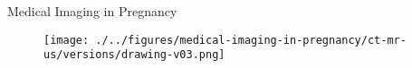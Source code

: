 
{
\begin{frame}{Medical Imaging in Pregnancy}
      \begin{figure}
        \centering
        \texttt{[image: ./../figures/medical-imaging-in-pregnancy/ct-mr-us/versions/drawing-v03.png]}
      \end{figure}
\end{frame}
}




